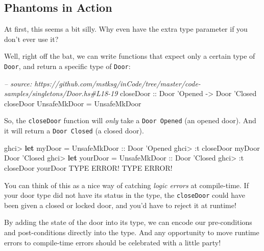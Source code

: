 \documentclass[]{article}
\newenvironment{Shaded}{}{}
\newcommand{\KeywordTok}[1]{\textcolor[rgb]{0.00,0.44,0.13}{\textbf{#1}}}
\newcommand{\DataTypeTok}[1]{\textcolor[rgb]{0.56,0.13,0.00}{#1}}
\newcommand{\CharTok}[1]{\textcolor[rgb]{0.25,0.44,0.63}{#1}}
\newcommand{\CommentTok}[1]{\textcolor[rgb]{0.38,0.63,0.69}{\textit{#1}}}
\newcommand{\OtherTok}[1]{\textcolor[rgb]{0.00,0.44,0.13}{#1}}
\newcommand{\FunctionTok}[1]{\textcolor[rgb]{0.02,0.16,0.49}{#1}}
\newcommand{\NormalTok}[1]{#1}
\begin{document}
\subsection{Phantoms in Action}\label{phantoms-in-action}

At first, this seems a bit silly. Why even have the extra type parameter if you
don't ever use it?

Well, right off the bat, we can write functions that expect only a certain type
of \texttt{Door}, and return a specific type of \texttt{Door}:

\begin{Shaded}
\begin{Highlighting}[]
\CommentTok{-- source: https://github.com/mstksg/inCode/tree/master/code-samples/singletons/Door.hs#L18-19}
\OtherTok{closeDoor ::} \DataTypeTok{Door} \CharTok{'Opened -> Door '}\DataTypeTok{Closed}
\NormalTok{closeDoor }\DataTypeTok{UnsafeMkDoor} \FunctionTok{=} \DataTypeTok{UnsafeMkDoor}
\end{Highlighting}
\end{Shaded}

So, the \texttt{closeDoor} function will \emph{only} take a
\texttt{Door\ \textquotesingle{}Opened} (an opened door). And it will return a
\texttt{Door\ \textquotesingle{}Closed} (a closed door).

\begin{Shaded}
\begin{Highlighting}[]
\NormalTok{ghci}\FunctionTok{>} \KeywordTok{let}\NormalTok{ myDoor }\FunctionTok{=} \DataTypeTok{UnsafeMkDoor}\OtherTok{ ::} \DataTypeTok{Door} \CharTok{'Opened}
\NormalTok{ghci}\FunctionTok{>} \FunctionTok{:}\NormalTok{t closeDoor myDoor}
\DataTypeTok{Door} \CharTok{'Closed}
\NormalTok{ghci}\FunctionTok{>} \KeywordTok{let}\NormalTok{ yourDoor }\FunctionTok{=} \DataTypeTok{UnsafeMkDoor}\OtherTok{ ::} \DataTypeTok{Door} \CharTok{'Closed}
\NormalTok{ghci}\FunctionTok{>} \FunctionTok{:}\NormalTok{t closeDoor yourDoor}
\DataTypeTok{TYPE} \DataTypeTok{ERROR}\FunctionTok{!}  \DataTypeTok{TYPE} \DataTypeTok{ERROR}\FunctionTok{!}
\end{Highlighting}
\end{Shaded}

You can think of this as a nice way of catching \emph{logic errors} at
compile-time. If your door type did not have its status in the type, the
\texttt{closeDoor} could have been given a closed or locked door, and you'd have
to reject it at runtime!

By adding the state of the door into its type, we can encode our pre-conditions
and post-conditions directly into the type. And any opportunity to move runtime
errors to compile-time errors should be celebrated with a little party!
\end{document}

